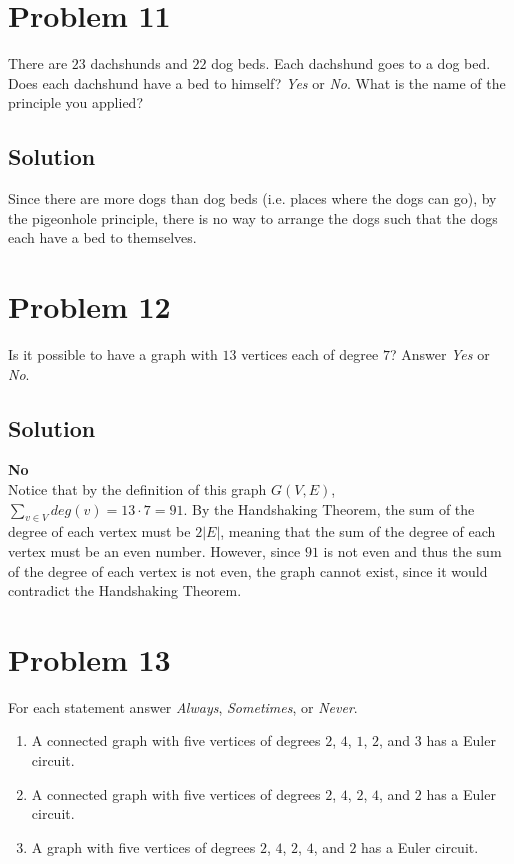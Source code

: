 \documentclass[table]{article}
\begin{document}
\section{Problem 11}
There are $23$ dachshunds and $22$ dog beds. Each dachshund goes to a dog bed. Does each dachshund have a bed to himself? \textit{Yes} or \textit{No}. What is the name of the principle you applied?
\subsection{Solution}
Since there are more dogs than dog beds (i.e. places where the dogs can go), by the pigeonhole principle, there is no way to arrange the dogs such that the dogs each have a bed to themselves.
\section{Problem 12}
Is it possible to have a graph with $13$ vertices each of degree $7$? Answer \textit{Yes} or \textit{No}.
\subsection{Solution}
\textbf{No}\\
Notice that by the definition of this graph $G(V, E)$, $\sum_{v \in V}^{} deg(v) = 13 \cdot 7 = 91$. By the Handshaking Theorem, the sum of the degree of each vertex must be $2|E|$, meaning that the sum of the degree of each vertex must be an even number. However, since $91$ is not even and thus the sum of the degree of each vertex is not even, the graph cannot exist, since it would contradict the Handshaking Theorem.
\section{Problem 13}
For each statement answer \textit{Always}, \textit{Sometimes}, or \textit{Never}.
\begin{enumerate}[nosep,label=\alph*)]
\item A connected graph with five vertices of degrees $2$, $4$, $1$, $2$, and $3$ has a Euler circuit.
\item A connected graph with five vertices of degrees $2$, $4$, $2$, $4$, and $2$ has a Euler circuit.
\item A graph with five vertices of degrees $2$, $4$, $2$, $4$, and $2$ has a Euler circuit.
\end{enumerate}
\end{document}
